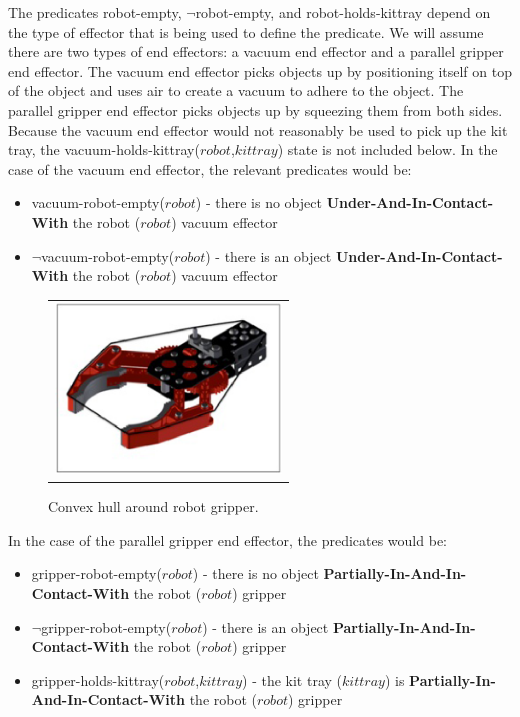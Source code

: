 \documentclass[final,1p,times]{elsarticle}
\newcommand{\const}[1] {$\mathit{#1}$}
\newcommand{\stvar}[1] {\textsf{#1}}
\begin{document}
The predicates \stvar{robot-empty}, $\neg$\stvar{robot-empty}, and \stvar{robot-holds-kittray} depend on the type of effector that is being used to define the predicate. We will assume there are two types of end effectors: a vacuum end effector and a parallel gripper end effector. The vacuum end effector picks objects up by positioning itself on top of the object and uses air to create a vacuum to adhere to the object. The parallel gripper end effector picks objects up by squeezing them from both sides.  Because the vacuum end effector would not reasonably be used to pick up the kit tray, the \stvar{vacuum-holds-kittray}(\const{robot},\const{kittray}) state is not included below. In the case of the vacuum end effector, the relevant predicates would be:


\begin{itemize}
\item \stvar{vacuum-robot-empty}(\const{robot}) - there is no object \textbf{Under-And-In-Contact-With} the robot (\const{robot}) vacuum effector
\item $\neg$\stvar{vacuum-robot-empty}(\const{robot}) - there is an object \textbf{Under-And-In-Contact-With} the robot (\const{robot}) vacuum effector
\end{itemize}
\begin{figure}[h!t!]
\begin{center}
\begin{tabular}{c}
\includegraphics[width=6cm]{gripper.eps}
\end{tabular}
\end{center}
\caption{Convex hull around robot gripper.}
\label{fig:gripper}
\end{figure}
In the case of the parallel gripper end effector, the predicates would be:
\begin{itemize}
\item \stvar{gripper-robot-empty}(\const{robot}) - there is no object \textbf{Partially-In-And-In-Contact-With} the robot (\const{robot}) gripper
\item $\neg$\stvar{gripper-robot-empty}(\const{robot}) - there is an object \textbf{Partially-In-And-In-Contact-With} the robot (\const{robot}) gripper
\item \stvar{gripper-holds-kittray}(\const{robot},\const{kittray}) - the kit tray (\const{kittray}) is \textbf{Partially-In-And-In-Contact-With} the robot (\const{robot}) gripper
\end{itemize}
\end{document}
